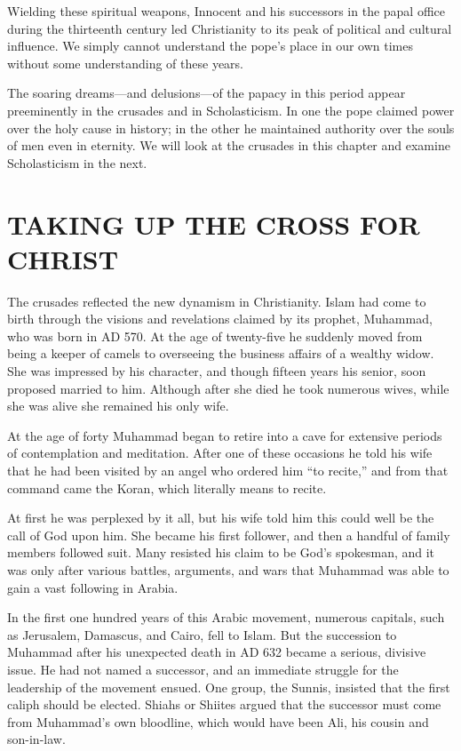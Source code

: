 Wielding these spiritual weapons, Innocent and his successors in the papal office during the
thirteenth century led Christianity to its peak of political and cultural influence. We simply
cannot understand the pope’s place in our own times without some understanding of these years.

The soaring dreams—and delusions—of the papacy in this period appear preeminently in the crusades
and in Scholasticism. In one the pope claimed power over the holy cause in history; in the other he
maintained authority over the souls of men even in eternity. We will look at the crusades in this
chapter and examine Scholasticism in the next.

\section{TAKING UP THE CROSS FOR CHRIST}

The crusades reflected the new dynamism in Christianity. Islam had come to birth through the visions
and revelations claimed by its prophet, Muhammad, who was born in AD 570. At the age of twenty-five
he suddenly moved from being a keeper of camels to overseeing the business affairs of a wealthy
widow. She was impressed by his character, and though fifteen years his senior, soon proposed
married to him. Although after she died he took numerous wives, while she was alive she remained his
only wife.

At the age of forty Muhammad began to retire into a cave for extensive periods of contemplation and
meditation. After one of these occasions he told his wife that he had been visited by an angel who
ordered him “to recite,” and from that command came the Koran, which literally means to recite.

At first he was perplexed by it all, but his wife told him this could well be the call of God upon
him. She became his first follower, and then a handful of family members followed suit. Many
resisted his claim to be God’s spokesman, and it was only after various battles, arguments, and wars
that Muhammad was able to gain a vast following in Arabia.

In the first one hundred years of this Arabic movement, numerous capitals, such as Jerusalem,
Damascus, and Cairo, fell to Islam. But the succession to Muhammad after his unexpected death in AD
632 became a serious, divisive issue. He had not named a successor, and an immediate struggle for
the leadership of the movement ensued. One group, the Sunnis, insisted that the first caliph should
be elected. Shiahs or Shiites argued that the successor must come from Muhammad’s own bloodline,
which would have been Ali, his cousin and son-in-law.

